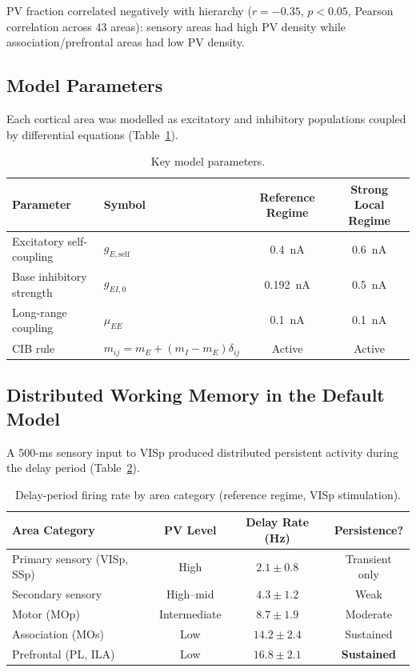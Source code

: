\documentclass[11pt]{article}
\begin{document}
PV fraction correlated negatively with hierarchy ($r = -0.35$, $p < 0.05$, Pearson correlation across 43 areas): sensory areas had high PV density while association/prefrontal areas had low PV density.

\subsection{Model Parameters}

Each cortical area was modelled as excitatory and inhibitory populations coupled by differential equations (Table~\ref{tab:params}).

\begin{table}[H]
\centering
\caption{Key model parameters.}
\label{tab:params}
\begin{tabular}{@{}llcc@{}}
\toprule
Parameter & Symbol & Reference Regime & Strong Local Regime \\
\midrule
Excitatory self-coupling & $g_{E,\text{self}}$ & 0.4~nA & 0.6~nA \\
Base inhibitory strength & $g_{EI,0}$ & 0.192~nA & 0.5~nA \\
Long-range coupling & $\mu_{EE}$ & 0.1~nA & 0.1~nA \\
CIB rule & $m_{ij} = m_E + (m_I - m_E)\delta_{ij}$ & Active & Active \\
\bottomrule
\end{tabular}
\end{table}

\subsection{Distributed Working Memory in the Default Model}

A 500-ms sensory input to VISp produced distributed persistent activity during the delay period (Table~\ref{tab:wm}).

\begin{table}[H]
\centering
\caption{Delay-period firing rate by area category (reference regime, VISp stimulation).}
\label{tab:wm}
\begin{tabular}{@{}lccc@{}}
\toprule
Area Category & PV Level & Delay Rate (Hz) & Persistence? \\
\midrule
Primary sensory (VISp, SSp) & High & $2.1 \pm 0.8$ & Transient only \\
Secondary sensory & High--mid & $4.3 \pm 1.2$ & Weak \\
Motor (MOp) & Intermediate & $8.7 \pm 1.9$ & Moderate \\
Association (MOs) & Low & $14.2 \pm 2.4$ & Sustained \\
Prefrontal (PL, ILA) & Low & $16.8 \pm 2.1$ & \textbf{Sustained} \\
\bottomrule
\end{tabular}
\end{table}
\end{document}
